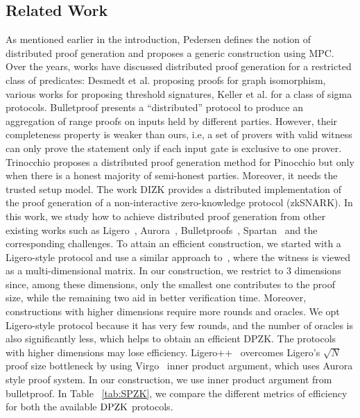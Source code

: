 \subsection{Related Work}\label{sec:relatedwork}
As mentioned earlier in the introduction, Pedersen \cite{Ped92} defines the
notion of distributed proof generation and proposes a generic construction using
MPC. Over the years, works have discussed distributed proof generation for a
restricted class of predicates: Desmedt et al. \cite{DDB94} proposing proofs for
graph isomorphism, various works \cite{King05, DDS, Desmedt2011} for proposing
threshold signatures, Keller et al. \cite{EfficientTZ} for a class of sigma
protocols. Bulletproof  \cite{bulletproofs} presents a
``distributed'' protocol to produce an aggregation of range proofs on inputs
held by different parties. However, their completeness property is weaker than
ours, i.e, a set of provers with valid witness can only prove the statement only if each input gate is exclusive to one prover. 
Trinocchio \cite{trinocchio} proposes a distributed proof generation method for
Pinocchio  \cite{pinnochio_PHGR} but only when there is a
honest majority of semi-honest parties. Moreover, it needs the trusted setup
model. The work DIZK \cite{dizk} provides a distributed implementation of the proof generation of a non-interactive zero-knowledge protocol (zkSNARK). In this work, we study how to achieve distributed proof generation from other existing works such as Ligero~\cite{ligero}, Aurora~\cite{aurora}, Bulletproofs~\cite{bulletproofs}, Spartan~\cite{spartan} and the corresponding challenges. To attain an efficient construction, we started with a Ligero-style protocol and use a similar approach to~\cite{bootle2020linear, bootle2020zero}, where the witness is viewed as a multi-dimensional matrix. In our construction, we restrict to 3 dimensions since, among these dimensions, only the smallest one contributes to the proof size, while the remaining two aid in better verification time. Moreover, constructions with higher dimensions require more rounds and oracles. We opt Ligero-style protocol because it has very few rounds, and the number of oracles is also significantly less, which helps to obtain an efficient DPZK. The protocols with higher dimensions may lose efficiency. Ligero++~\cite{ligero++} overcomes Ligero's $\sqrt{N}$ proof size bottleneck by using Virgo~\cite{Virgo} inner product argument, which uses Aurora style proof system. In our construction, we use inner product argument from bulletproof. In Table ~\ref{tab:SPZK}, we compare the different metrics of efficiency for both the available $\text{DPZK}$ protocols. 
